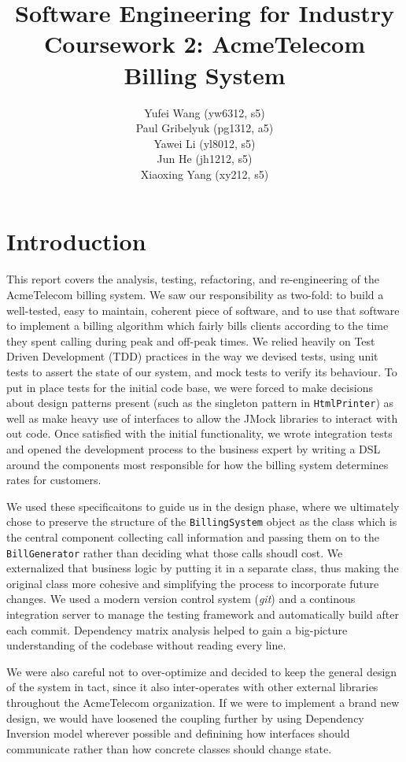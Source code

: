 \documentclass[a4paper,12pt,oneside,final]{article}
\author{
    Yufei Wang (yw6312, s5) \\ 
    Paul Gribelyuk (pg1312, a5) \\
    Yawei Li (yl8012, s5) \\ 
    Jun He (jh1212, s5) \\
    Xiaoxing Yang (xy212, s5)
}
\title{\Huge Software Engineering for Industry \\ Coursework 2: AcmeTelecom Billing System}
\begin{document}
\maketitle
\section{Introduction} %
This report covers the analysis, testing, refactoring, and re-engineering of the AcmeTelecom billing system.  We saw our responsibility as two-fold: to build a well-tested, easy to maintain, coherent piece of software, and to use that software to implement a billing algorithm which fairly bills clients according to the time they spent calling during peak and off-peak times.  We relied heavily on Test Driven Development (TDD) practices in the way we devised tests, using unit tests to assert the state of our system, and mock tests to verify its behaviour.  To put in place tests for the initial code base, we were forced to make decisions about design patterns present (such as the singleton pattern in \verb+HtmlPrinter+) as well as make heavy use of interfaces to allow the JMock libraries to interact with out code.  Once satisfied with the initial functionality, we wrote integration tests and opened the development process to the business expert by writing a DSL around the components most responsible for how the billing system determines rates for customers.

We used these specificaitons to guide us in the design phase, where we ultimately chose to preserve the structure of the \verb+BillingSystem+ object as the class which is the central component collecting call information and passing them on to the \verb+BillGenerator+ rather than deciding what those calls shoudl cost.  We externalized that business logic by putting it in a separate class, thus making the original class more cohesive and simplifying the process to incorporate future changes.  We used a modern version control system (\emph{git}) and a continous integration server to manage the testing framework and automatically build after each commit.  Dependency matrix analysis helped to gain a big-picture understanding of the codebase without reading every line.

We were also careful not to over-optimize and decided to keep the general design of the system in tact, since it also inter-operates with other external libraries throughout the AcmeTelecom organization.  If we were to implement a brand new design, we would have loosened the coupling further by using Dependency Inversion model wherever possible and definining how interfaces should communicate rather than how concrete classes should change state.
	
\end{document}
